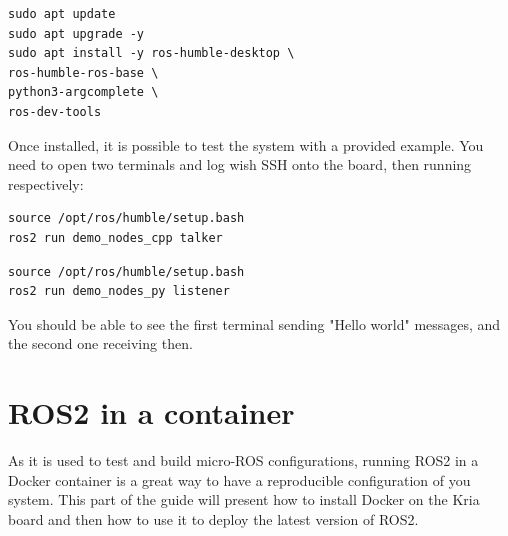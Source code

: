 \documentclass[10pt]{article}
\begin{document}
\begin{tcolorbox}
\begin{verbatim}
sudo apt update
sudo apt upgrade -y
sudo apt install -y ros-humble-desktop \
ros-humble-ros-base \
python3-argcomplete \
ros-dev-tools
\end{verbatim}
\end{tcolorbox}

Once installed, it is possible to test the system with a provided example.
You need to open two terminals and log wish SSH onto the board, then running
respectively:

\begin{tcolorbox}
\begin{verbatim}
source /opt/ros/humble/setup.bash
ros2 run demo_nodes_cpp talker
\end{verbatim}
\end{tcolorbox}



\begin{tcolorbox}
\begin{verbatim}
source /opt/ros/humble/setup.bash
ros2 run demo_nodes_py listener
\end{verbatim}
\end{tcolorbox}


You should be able to see the first terminal sending "Hello world" messages,
and the second one receiving then.


\section{ROS2 in a container}
As it is used to test and build micro-ROS configurations, running ROS2 in a
Docker container is a great way to have a reproducible configuration
of you system. This part of the guide will present how to install Docker on the
Kria board and then how to use it to deploy the latest version of ROS2.
\end{document}
